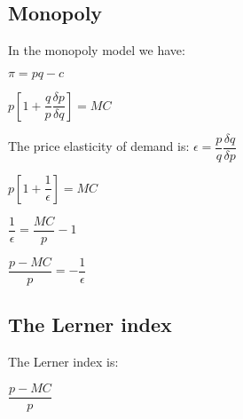 
\subsection{Monopoly}

In the monopoly model we have:

\(\pi = pq-c\)

\(p[1+\dfrac{q}{p}\dfrac{\delta p}{\delta q}]=MC\)

The price elasticity of demand is: \(\epsilon = \dfrac{p}{q}\dfrac{\delta q}{\delta p}\)

\(p[1+\dfrac{1}{\epsilon }]=MC\)

\(\dfrac{1}{\epsilon }=\dfrac{MC}{p}-1\)

\(\dfrac{p-MC}{p}=-\dfrac{1}{\epsilon }\)

\subsection{The Lerner index}

The Lerner index is:

\(\dfrac{p-MC}{p}\)

